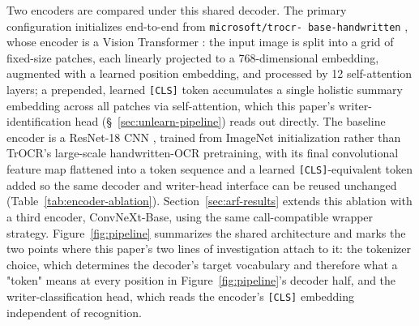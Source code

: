 \documentclass[a4paper,fleqn]{cas-dc}
\begin{document}
Two encoders are compared under this shared decoder. The primary
configuration initializes end-to-end from \texttt{microsoft/trocr-\allowbreak
base-handwritten} \citep{li2023trocr}, whose encoder is a Vision
Transformer \citep{dosovitskiy2021vit}: the input image is split into a
grid of fixed-size patches, each linearly projected to a 768-dimensional
embedding, augmented with a learned position embedding, and processed by
12 self-attention layers; a prepended, learned \texttt{[CLS]} token
accumulates a single holistic summary embedding across all patches via
self-attention, which this paper's writer-identification head (\S~\ref{sec:unlearn-pipeline})
reads out directly. The baseline encoder is a
ResNet-18 CNN \citep{he2016resnet}, trained from ImageNet initialization
rather than TrOCR's large-scale handwritten-OCR pretraining, with its
final convolutional feature map flattened into a token sequence and a
learned \texttt{[CLS]}-equivalent token added so the same decoder and
writer-head interface can be reused unchanged (Table~\ref{tab:encoder-ablation}).
Section~\ref{sec:arf-results} extends this ablation with a third encoder,
ConvNeXt-Base, using the same call-compatible wrapper strategy.
Figure~\ref{fig:pipeline} summarizes the shared architecture and marks the
two points where this paper's two lines of investigation attach to it:
the tokenizer choice, which determines the decoder's target vocabulary and
therefore what a "token" means at every position in
Figure~\ref{fig:pipeline}'s decoder half, and the writer-classification
head, which reads the encoder's \texttt{[CLS]} embedding independent of
recognition.
\end{document}

